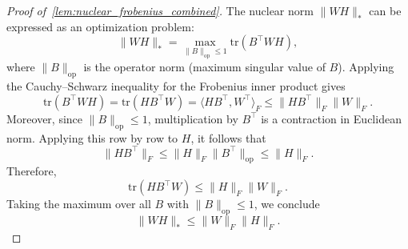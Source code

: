 \documentclass[11pt]{article}
\begin{document}
\begin{proof}[Proof of~\cref{lem:nuclear_frobenius_combined}]
The nuclear norm \( \|WH\|_* \) can be expressed as an optimization problem:
  \[
  \|WH\|_* = \max_{\|B\|_{\mathrm{op}} \le 1} \mathrm{tr}(B^\top WH),
  \]
  where \( \|B\|_{\mathrm{op}} \) is the operator norm (maximum singular value of \( B \)). Applying the Cauchy--Schwarz inequality for the Frobenius inner product gives
  \[
  \mathrm{tr}\left(B^\top W H\right) = \mathrm{tr}\left(H B^\top W\right)
  =
  \langle HB^\top,W^\top\rangle_F
  \le \|H B^\top\|_{F} \|W\|_{F}.
  \]
  Moreover, since \(\|B\|_{\mathrm{op}} \le 1\), multiplication by
  \(B^\top\) is a contraction in Euclidean norm. Applying this row by row to
  \(H\), it follows that
  \[
  \|H B^\top\|_{F} \le \|H\|_{F}   \|B^\top\|_{\mathrm{op}} \le \|H\|_{F}.
  \]
  Therefore,
  \[
  \mathrm{tr}\left(H B^\top W\right) \le \|H\|_{F}   \|W\|_{F}.
  \]
  Taking the maximum over all \(B\) with \(\|B\|_{\mathrm{op}} \le 1\), we conclude
  \[
  \|W H\|_{*} \le \|W\|_{F}    \|H\|_{F}.
  \]

\end{proof}
\end{document}
